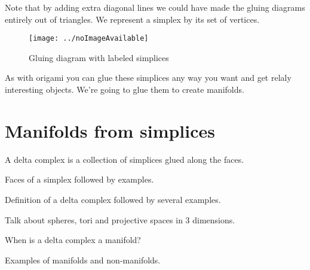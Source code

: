 Note that by adding extra diagonal lines we could have made the gluing diagrams entirely out of triangles.
We represent a simplex by its set of vertices.

\begin{figure}[h]
	\centering \texttt{[image: ../noImageAvailable]}
	\caption{Gluing diagram with labeled simplices}
	\label{}
\end{figure}

As with origami you can glue these simplices any way you want and get relaly interesting objects. We're going to glue them to create manifolds.

\section{Manifolds from simplices}
A delta complex is a collection of simplices glued along the faces.

\begin{definition}
	Faces of a simplex followed by examples.
\end{definition}

\begin{definition}
	Definition of a delta complex followed by several examples.
\end{definition}

Talk about spheres, tori and projective spaces in 3 dimensions.

\begin{ques}
	When is a delta complex a manifold?
\end{ques}

Examples of manifolds and non-manifolds.






